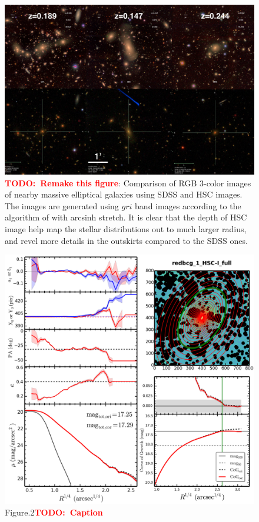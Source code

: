 \documentclass[preprint]{aastex}
\newcommand{\todo}[1]{\textcolor{red}{\textbf{TODO:~#1}}}
\begin{document}
\begin{CJK*}{UTF8}{gbsn}

\clearpage
{}
\begin{figure}
    \centering 
    \includegraphics[width=15.5cm]{fig/redbcg_color.png}
    \caption{\todo{Remake this figure}: Comparison of RGB 3-color images 
    of nearby massive elliptical galaxies using SDSS and HSC images.  
    The images are generated using $gri$ band images according to the algorithm 
    of \citep{Lupton2004} with arcsinh stretch.  
    It is clear that the depth of HSC image help map the stellar distributions 
    out to much larger radius, and revel more details in the outskirts compared 
    to the SDSS ones.}\label{figure:1}
\end{figure}

\clearpage
{}
\begin{figure}
    \centering 
    \includegraphics[width=15.5cm]{fig/redbcg_ellipse_example.png}
    \caption{Figure.2\todo{Caption}}\label{figure:2}
\end{figure}


\end{CJK*}
\end{document}
